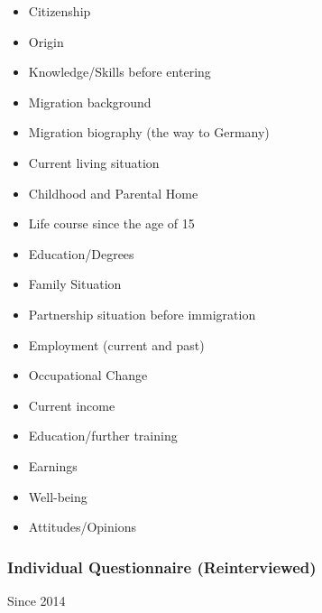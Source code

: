 \documentclass[letterpaper,10pt,openany,onesideH,english]{sphinxmanual}
\begin{document}
\begin{itemize}
\item {} 
Citizenship

\item {} 
Origin

\item {} 
Knowledge/Skills before entering

\item {} 
Migration background

\item {} 
Migration biography (the way to Germany)

\item {} 
Current living situation

\item {} 
Childhood and Parental Home

\item {} 
Life course since the age of 15

\item {} 
Education/Degrees

\item {} 
Family Situation

\item {} 
Partnership situation before immigration

\item {} 
Employment (current and past)

\item {} 
Occupational Change

\item {} 
Current income

\item {} 
Education/further training

\item {} 
Earnings

\item {} 
Well-being

\item {} 
Attitudes/Opinions

\end{itemize}


\subsubsection{Individual Questionnaire (Reinterviewed)}
\label{\detokenize{Contents of SOEPcore/index:individual-questionnaire-reinterviewed}}
 Since 2014
\end{document}
